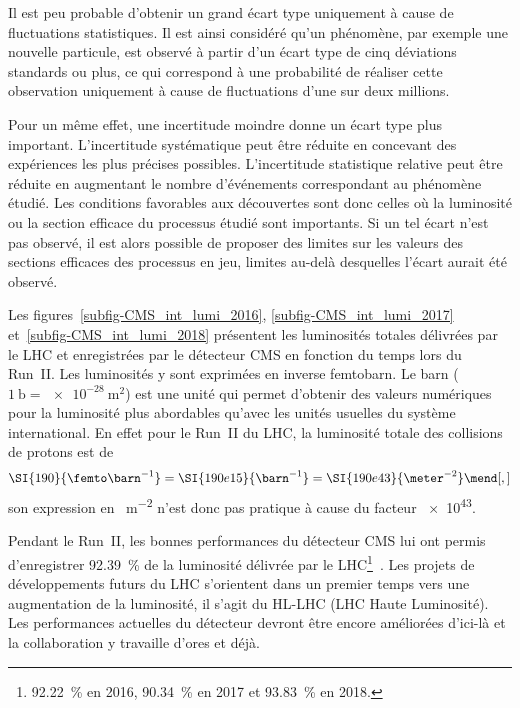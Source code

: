 Il est peu probable d'obtenir un grand écart type uniquement à cause de fluctuations statistiques.
Il est ainsi considéré qu'un phénomène, par exemple une nouvelle particule, est observé à partir d'un écart type de cinq déviations standards ou plus, ce qui correspond à une probabilité de réaliser cette observation uniquement à cause de fluctuations d'une sur deux millions.
\par Pour un même effet, une incertitude moindre donne un écart type plus important.
L'incertitude systématique peut être réduite en concevant des expériences les plus précises possibles.
L'incertitude statistique relative peut être réduite en augmentant le nombre d'événements correspondant au phénomène étudié.
Les conditions favorables aux découvertes sont donc celles où la luminosité ou la section efficace du processus étudié sont importants.
Si un tel écart n'est pas observé, il est alors possible de proposer des limites sur les valeurs des sections efficaces des processus en jeu, limites au-delà desquelles l'écart aurait été observé.
\par Les figures~\ref{subfig-CMS_int_lumi_2016}, \ref{subfig-CMS_int_lumi_2017} et~\ref{subfig-CMS_int_lumi_2018} présentent les luminosités totales délivrées par le LHC et enregistrées par le détecteur CMS en fonction du temps lors du Run~II.
Les luminosités y sont exprimées en inverse femtobarn.
Le barn ($\SI{1}{\barn}=\SI{e-28}{\meter^2}$) est une unité qui permet d'obtenir des valeurs numériques pour la luminosité plus abordables qu'avec les unités usuelles du système international.
En effet pour le Run~II du LHC, la luminosité totale des collisions de protons est de
\begin{equation}
\SI{190}{\femto\barn^{-1}} = \SI{190e15}{\barn^{-1}} = \SI{190e43}{\meter^{-2}}
\mend[,]
\end{equation}
son expression en \SI{}{\meter^{-2}} n'est donc pas pratique à cause du facteur \num{e43}.
\par Pendant le Run~II, les bonnes performances du détecteur CMS lui ont permis d'enregistrer \SI{92.39}{\%} de la luminosité délivrée par le LHC\footnote{\SI{92.22}{\%} en 2016, \SI{90.34}{\%} en 2017 et \SI{93.83}{\%} en 2018.}~\cite{CMS-PAS-LUM-17-001,CMS-PAS-LUM-17-004,CMS-PAS-LUM-18-002}.
Les projets de développements futurs du LHC s'orientent dans un premier temps vers une augmentation de la luminosité, il s'agit du \og HL-LHC \fg{} (LHC Haute Luminosité).
Les performances actuelles du détecteur devront être encore améliorées d'ici-là et la collaboration y travaille d'ores et déjà.
